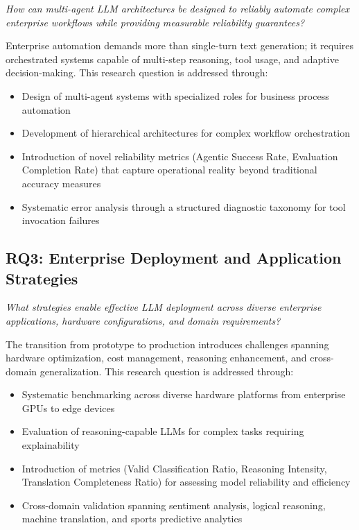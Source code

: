\textit{How can multi-agent LLM architectures be designed to reliably automate complex enterprise workflows while providing measurable reliability guarantees?}

Enterprise automation demands more than single-turn text generation; it requires orchestrated systems capable of multi-step reasoning, tool usage, and adaptive decision-making. This research question is addressed through:

\begin{itemize}[leftmargin=*]
    \item Design of multi-agent systems with specialized roles for business process automation
    \item Development of hierarchical architectures for complex workflow orchestration
    \item Introduction of novel reliability metrics (Agentic Success Rate, Evaluation Completion Rate) that capture operational reality beyond traditional accuracy measures
    \item Systematic error analysis through a structured diagnostic taxonomy for tool invocation failures
\end{itemize}

\subsection{RQ3: Enterprise Deployment and Application Strategies}

\textit{What strategies enable effective LLM deployment across diverse enterprise applications, hardware configurations, and domain requirements?}

The transition from prototype to production introduces challenges spanning hardware optimization, cost management, reasoning enhancement, and cross-domain generalization. This research question is addressed through:

\begin{itemize}[leftmargin=*]
    \item Systematic benchmarking across diverse hardware platforms from enterprise GPUs to edge devices
    \item Evaluation of reasoning-capable LLMs for complex tasks requiring explainability
    \item Introduction of metrics (Valid Classification Ratio, Reasoning Intensity, Translation Completeness Ratio) for assessing model reliability and efficiency
    \item Cross-domain validation spanning sentiment analysis, logical reasoning, machine translation, and sports predictive analytics
\end{itemize}

